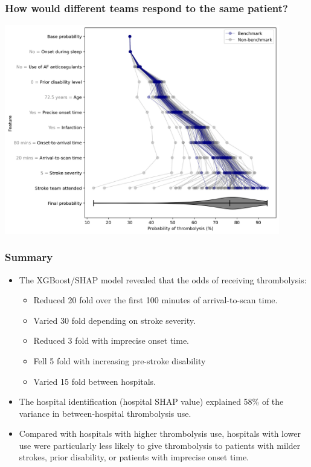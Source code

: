 \documentclass{beamer}
\begin{document}
\begin{frame}
\frametitle{How would different teams respond to the same patient?}

    \begin{center}
    \includegraphics[width=0.9\textwidth]{./images/shap_waterfall_with_violin.jpg}
    \end{center}

\end{frame}



\begin{frame}
\frametitle{Summary}
\small

\begin{itemize}
    \item The XGBoost/SHAP model revealed that the odds of receiving thrombolysis:



    \begin{itemize}
        \item Reduced 20 fold over the first 100 minutes of arrival-to-scan time.
        \item Varied 30 fold depending on stroke severity.
        \item Reduced 3 fold with imprecise onset time.
        \item Fell 5 fold with increasing pre-stroke disability
        \item Varied 15 fold between hospitals. 
    \end{itemize}

\item The hospital identification (hospital SHAP value) explained 58\% of the variance in between-hospital thrombolysis use. 

\item Compared with hospitals with higher thrombolysis use, hospitals with lower use were particularly less likely to give thrombolysis to patients with milder strokes, prior disability, or patients with imprecise onset time.
\end{itemize}

\end{frame}

\end{document}
